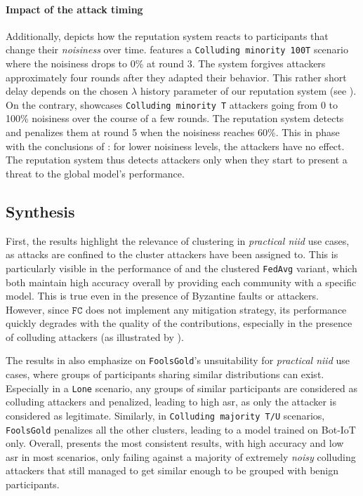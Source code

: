 \paragraph*{Impact of the attack timing\label{sec:radar.results.flipping.timing}}

Additionally,  depicts how the reputation system reacts to participants that change their \emph{noisiness} over time. 
 features a \texttt{Colluding minority 100T} scenario where the noisiness drops to 0\% at round 3. 
The system forgives attackers approximately four rounds after they adapted their behavior.
This rather short delay depends on the chosen $\lambda$ history parameter of our reputation system (see ). 
On the contrary,  showcases \texttt{Colluding minority T} attackers going from 0 to 100\% noisiness over the course of a few rounds.
The reputation system detects and penalizes them at round 5 when the noisiness reaches 60\%. 
This in phase with the conclusions of : for lower noisiness levels, the attackers have no effect. 
The reputation system thus detects attackers only when they start to present a threat to the global model's performance. 


\subsection{Synthesis\label{sec:radar.results.synthesis}}

First, the results highlight the relevance of clustering in \emph{practical \gls{niid}} use cases, as attacks are confined to the cluster attackers have been assigned to.
This is particularly visible in the performance of \thecontrib and the clustered \texttt{FedAvg} variant, which both maintain high accuracy overall by providing each community with a specific model.
This is true even in the presence of Byzantine faults or attackers.
However, since $\texttt{FC}$ does not implement any mitigation strategy, its performance quickly degrades with the quality of the contributions, especially in the presence of colluding attackers (as illustrated by ).

The results in  also emphasize on \texttt{FoolsGold}'s unsuitability for \emph{practical \gls{niid}} use cases, where groups of participants sharing similar distributions can exist.
Especially in a \texttt{Lone} scenario, any groups of similar participants are considered as colluding attackers and penalized, leading to high \gls{asr}, as only the attacker is considered as legitimate.
Similarly, in \texttt{Colluding majority T/U} scenarios, \texttt{FoolsGold} penalizes all the other clusters, leading to a model trained on Bot-IoT only.
Overall, \thecontrib presents the most consistent results, with high accuracy and low \gls{asr} in most scenarios, only failing against a majority of extremely \emph{noisy} colluding attackers that still managed to get similar enough to be grouped with benign participants.

